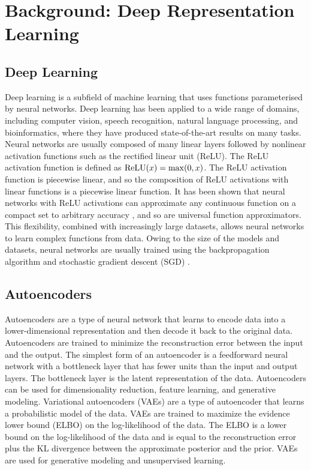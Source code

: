 \section{Background: Deep Representation Learning}

\subsection{Deep Learning}

Deep learning is a subfield of machine learning that uses functions parameterised by neural networks.
Deep learning has been applied to a wide range of domains, including computer vision, speech recognition, natural language processing, and bioinformatics, where they have produced state-of-the-art results on many tasks.
Neural networks are usually composed of many linear layers followed by nonlinear activation functions such as the rectified linear unit (ReLU).
The ReLU activation function is defined as $\operatorname{ReLU}(x) = \max(0, x)$.
The ReLU activation function is piecewise linear, and so the composition of ReLU activations with linear functions is a piecewise linear function.
It has been shown that neural networks with ReLU activations can approximate any continuous function on a compact set to arbitrary accuracy \citep{perekrestenko2018universal}, and so are universal function approximators.
This flexibility, combined with increasingly large datasets, allows neural networks to learn complex functions from data.
Owing to the size of the models and datasets, neural networks are usually trained using the backpropagation algorithm and stochastic gradient descent (SGD) \citep{amari1993backpropagation}.

\subsection{Autoencoders}

Autoencoders are a type of neural network that learns to encode data into a lower-dimensional representation and then decode it back to the original data.
Autoencoders are trained to minimize the reconstruction error between the input and the output.
The simplest form of an autoencoder is a feedforward neural network with a bottleneck layer that has fewer units than the input and output layers.
The bottleneck layer is the latent representation of the data.
Autoencoders can be used for dimensionality reduction, feature learning, and generative modeling.
Variational autoencoders (VAEs) \citep{kingma2013auto} are a type of autoencoder that learns a probabilistic model of the data.
VAEs are trained to maximize the evidence lower bound (ELBO) on the log-likelihood of the data.
The ELBO is a lower bound on the log-likelihood of the data and is equal to the reconstruction error plus the KL divergence between the approximate posterior and the prior.
VAEs are used for generative modeling and unsupervised learning.

